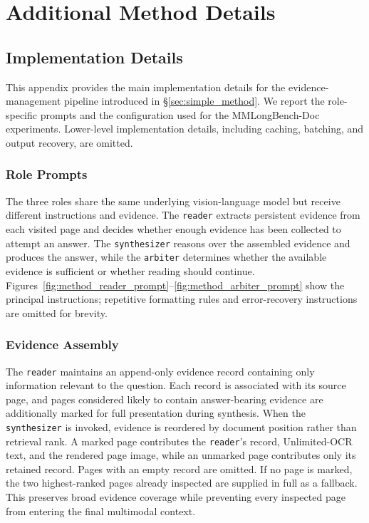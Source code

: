 \clearpage
\chapter{Additional Method Details}
\label{app:simple_method_details}

\section{Implementation Details}

This appendix provides the main implementation details for the evidence-management pipeline introduced in \S\ref{sec:simple_method}. We report the role-specific prompts and the configuration used for the MMLongBench-Doc experiments. Lower-level implementation details, including caching, batching, and output recovery, are omitted.

\subsection{Role Prompts}
\label{app:method_prompts}

The three roles share the same underlying vision-language model but receive different instructions and evidence. The \texttt{reader} extracts persistent evidence from each visited page and decides whether enough evidence has been collected to attempt an answer. The \texttt{synthesizer} reasons over the assembled evidence and produces the answer, while the \texttt{arbiter} determines whether the available evidence is sufficient or whether reading should continue. Figures~\ref{fig:method_reader_prompt}--\ref{fig:method_arbiter_prompt} show the principal instructions; repetitive formatting rules and error-recovery instructions are omitted for brevity.







\subsection{Evidence Assembly}
\label{app:method_evidence}

The \texttt{reader} maintains an append-only evidence record containing only information relevant to the question. Each record is associated with its source page, and pages considered likely to contain answer-bearing evidence are additionally marked for full presentation during synthesis. When the \texttt{synthesizer} is invoked, evidence is reordered by document position rather than retrieval rank. A marked page contributes the \texttt{reader}'s record, Unlimited-OCR text, and the rendered page image, while an unmarked page contributes only its retained record. Pages with an empty record are omitted. If no page is marked, the two highest-ranked pages already inspected are supplied in full as a fallback. This preserves broad evidence coverage while preventing every inspected page from entering the final multimodal context.

